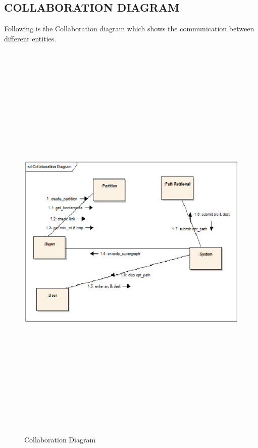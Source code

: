 \begin{center}
\section{\normalsize COLLABORATION DIAGRAM}
\hspace{5mm} Following is the Collaboration diagram which shows the communication between different entities.
\begin{figure}[H]
\includegraphics[width=14cm,height=20cm]{coll.eps}
\caption{Collaboration Diagram}
\end{figure}
\newpage




\end{center}
